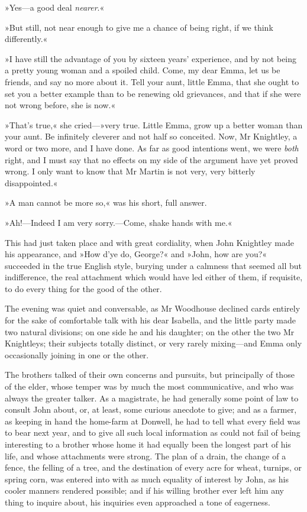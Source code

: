 »Yes—a good deal \textit{nearer}.«

»But still, not near enough to give me a chance of being right, if we think differently.«

»I have still the advantage of you by sixteen years' experience, and by not being a pretty young woman and a spoiled child. Come, my dear Emma, let us be friends, and say no more about it. Tell your aunt, little Emma, that she ought to set you a better example than to be renewing old grievances, and that if she were not wrong before, she is now.«

»That's true,« she cried—»very true. Little Emma, grow up a better woman than your aunt. Be infinitely cleverer and not half so conceited. Now, Mr Knightley, a word or two more, and I have done. As far as good intentions went, we were \textit{both} right, and I must say that no effects on my side of the argument have yet proved wrong. I only want to know that Mr Martin is not very, very bitterly disappointed.«

»A man cannot be more so,« was his short, full answer.

»Ah!—Indeed I am very sorry.—Come, shake hands with me.«

This had just taken place and with great cordiality, when John Knightley made his appearance, and »How d'ye do, George?« and »John, how are you?« succeeded in the true English style, burying under a calmness that seemed all but indifference, the real attachment which would have led either of them, if requisite, to do every thing for the good of the other.

The evening was quiet and conversable, as Mr Woodhouse declined cards entirely for the sake of comfortable talk with his dear Isabella, and the little party made two natural divisions; on one side he and his daughter; on the other the two Mr Knightleys; their subjects totally distinct, or very rarely mixing—and Emma only occasionally joining in one or the other.

The brothers talked of their own concerns and pursuits, but principally of those of the elder, whose temper was by much the most communicative, and who was always the greater talker. As a magistrate, he had generally some point of law to consult John about, or, at least, some curious anecdote to give; and as a farmer, as keeping in hand the home-farm at Donwell, he had to tell what every field was to bear next year, and to give all such local information as could not fail of being interesting to a brother whose home it had equally been the longest part of his life, and whose attachments were strong. The plan of a drain, the change of a fence, the felling of a tree, and the destination of every acre for wheat, turnips, or spring corn, was entered into with as much equality of interest by John, as his cooler manners rendered possible; and if his willing brother ever left him any thing to inquire about, his inquiries even approached a tone of eagerness.

